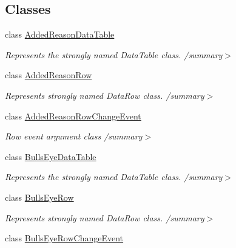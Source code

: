 \subsection*{Classes}
\begin{DoxyCompactItemize}
\item 
class \hyperlink{class_env_int_1_1_win32_1_1_field_tech_1_1_manager_1_1_data_sets_1_1_guide_ware_mobile_data_set_1_1_added_reason_data_table}{Added\+Reason\+Data\+Table}
\begin{DoxyCompactList}\small\item\em Represents the strongly named Data\+Table class. /summary$>$ \end{DoxyCompactList}\item 
class \hyperlink{class_env_int_1_1_win32_1_1_field_tech_1_1_manager_1_1_data_sets_1_1_guide_ware_mobile_data_set_1_1_added_reason_row}{Added\+Reason\+Row}
\begin{DoxyCompactList}\small\item\em Represents strongly named Data\+Row class. /summary$>$ \end{DoxyCompactList}\item 
class \hyperlink{class_env_int_1_1_win32_1_1_field_tech_1_1_manager_1_1_data_sets_1_1_guide_ware_mobile_data_set_03c6c2b8486bc739eb1146c140ad3745}{Added\+Reason\+Row\+Change\+Event}
\begin{DoxyCompactList}\small\item\em Row event argument class /summary$>$ \end{DoxyCompactList}\item 
class \hyperlink{class_env_int_1_1_win32_1_1_field_tech_1_1_manager_1_1_data_sets_1_1_guide_ware_mobile_data_set_1_1_bulls_eye_data_table}{Bulls\+Eye\+Data\+Table}
\begin{DoxyCompactList}\small\item\em Represents the strongly named Data\+Table class. /summary$>$ \end{DoxyCompactList}\item 
class \hyperlink{class_env_int_1_1_win32_1_1_field_tech_1_1_manager_1_1_data_sets_1_1_guide_ware_mobile_data_set_1_1_bulls_eye_row}{Bulls\+Eye\+Row}
\begin{DoxyCompactList}\small\item\em Represents strongly named Data\+Row class. /summary$>$ \end{DoxyCompactList}\item 
class \hyperlink{class_env_int_1_1_win32_1_1_field_tech_1_1_manager_1_1_data_sets_1_1_guide_ware_mobile_data_set_1_1_bulls_eye_row_change_event}{Bulls\+Eye\+Row\+Change\+Event}

\end{DoxyCompactItemize}

